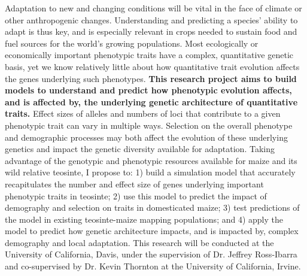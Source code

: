Adaptation to new and changing conditions will be vital in the face of climate or other anthropogenic changes. Understanding and predicting a species' ability to adapt is thus key, and is especially relevant in crops needed to sustain food and fuel sources for the world's growing populations. Most ecologically or economically important phenotypic traits have a complex, quantitative genetic basis, yet we know relatively little about how quantitative trait evolution affects the genes underlying such phenotypes. \textbf{This research project aims to build models to understand and predict how phenotypic evolution affects, and is affected by, the underlying genetic architecture of quantitative traits.} 
Effect sizes of alleles and numbers of loci that contribute to a given phenotypic trait can vary in multiple ways. Selection on the overall phenotype and demographic processes may both affect the evolution of these underlying genetics and impact the genetic diversity available for adaptation. 
Taking advantage of the genotypic and phenotypic resources available for maize and its wild relative teosinte, I propose to: 1) build a simulation model that accurately recapitulates the number and effect size of genes underlying important phenotypic traits in teosinte; 2) use this model to predict the impact of demography and selection on traits in domesticated maize; 3) test predictions of the model in existing teosinte-maize mapping populations; and 4) apply the model to predict how genetic architecture impacts, and is impacted by, complex demography and local adaptation.
This research will be conducted at the University of California, Davis, under the supervision of Dr. Jeffrey Ross\--Ibarra and co-supervised by Dr. Kevin Thornton at the University of California, Irvine.

